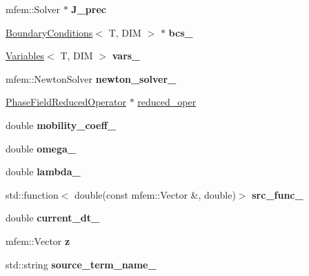 \begin{DoxyCompactItemize}
mfem\+::\+Solver $\ast$ {\bfseries J\+\_\+prec}
\item 
\mbox{\label{classPhaseFieldOperatorBase_ace8edd3371a4b1b1adaf22a36ad2041a}} 
\hyperlink{classBoundaryConditions}{Boundary\+Conditions}$<$ T, D\+IM $>$ $\ast$ {\bfseries bcs\+\_\+}
\item 
\mbox{\label{classPhaseFieldOperatorBase_a7613689c7c934e661ec287b7b878c9d2}} 
\hyperlink{classVariables}{Variables}$<$ T, D\+IM $>$ {\bfseries vars\+\_\+}
\item 
\mbox{\label{classPhaseFieldOperatorBase_ae643a34ec21563a1aa1e0baee30beb30}} 
mfem\+::\+Newton\+Solver {\bfseries newton\+\_\+solver\+\_\+}
\item 
\hyperlink{classPhaseFieldReducedOperator}{Phase\+Field\+Reduced\+Operator} $\ast$ \hyperlink{classPhaseFieldOperatorBase_a010a3da035afe945635288cc0ab2f0b5}{reduced\+\_\+oper}
\item 
\mbox{\label{classPhaseFieldOperatorBase_aaa799d0dbf5d04e158f276cc3e0a32cc}} 
double {\bfseries mobility\+\_\+coeff\+\_\+}
\item 
\mbox{\label{classPhaseFieldOperatorBase_a275f0cce177c9cd3c2cced2771b8f702}} 
double {\bfseries omega\+\_\+}
\item 
\mbox{\label{classPhaseFieldOperatorBase_a55ca706b0f6f4ee16eb1c27523569a2c}} 
double {\bfseries lambda\+\_\+}
\item 
\mbox{\label{classPhaseFieldOperatorBase_a1cc7b7915970f927c7e3bde1d06b9412}} 
std\+::function$<$ double(const mfem\+::\+Vector \&, double)$>$ {\bfseries src\+\_\+func\+\_\+}
\item 
\mbox{\label{classPhaseFieldOperatorBase_ac7c9e3138a6324901705e74da62421ea}} 
double {\bfseries current\+\_\+dt\+\_\+}
\item 
\mbox{\label{classPhaseFieldOperatorBase_a67fca8849db8e5659f633a2c0df694b7}} 
mfem\+::\+Vector {\bfseries z}
\item 
\mbox{\label{classPhaseFieldOperatorBase_aefbc006a9f535e2ab69a9a8964e2b159}} 
std\+::string {\bfseries source\+\_\+term\+\_\+name\+\_\+}
\end{DoxyCompactItemize}



